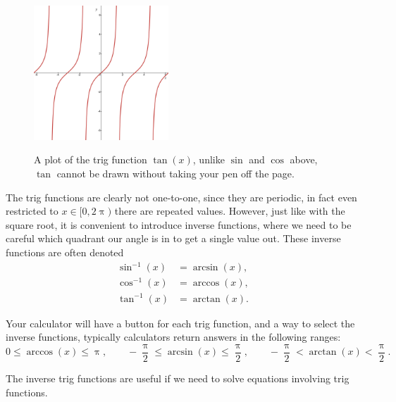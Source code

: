 \begin{figure}[ht]
    \centering
  \includegraphics[width=0.45\textwidth, alt ={Graph of a tan(x).}]{figures/tan_graph}
    \caption{A plot of the trig function $\tan(x)$, unlike $\sin$ and $\cos$ above, $\tan$ cannot be drawn without taking your pen off the page.  }
\label{fig: tan function}
\end{figure}

The trig functions are clearly not one-to-one, since they are periodic, in fact even restricted to $x\in[0,2\uppi)$ there are repeated values. However, just like with the square root, it is convenient to introduce inverse functions, where we need to be careful which quadrant our angle is in to get a single value out. These inverse functions are often denoted
\begin{align*}
\sin^{-1}(x)&=\arcsin(x),\\
\cos^{-1}(x)&=\arccos(x),\\
\tan^{-1}(x)&=\arctan(x).
\end{align*}

Your calculator will have a button for each trig function, and a way to select the inverse functions, typically calculators return answers in the following ranges:
\begin{equation*}
0\leq \arccos(x)\leq \uppi,\qquad -\frac{\uppi}{2}\leq \arcsin(x)\leq \frac{\uppi}{2}, \qquad -\frac{\uppi}{2}< \arctan(x)< \frac{\uppi}{2}.
\end{equation*}

The inverse trig functions are useful if we need to solve equations involving trig functions.\\

